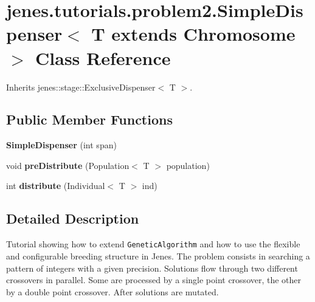 \hypertarget{classjenes_1_1tutorials_1_1problem2_1_1_simple_dispenser_3_01_t_01extends_01_chromosome_01_4}{
\section{jenes.tutorials.problem2.SimpleDispenser$<$ T extends Chromosome $>$ Class Reference}
\label{classjenes_1_1tutorials_1_1problem2_1_1_simple_dispenser_3_01_t_01extends_01_chromosome_01_4}
}
Inherits jenes::stage::ExclusiveDispenser$<$ T $>$.

\subsection*{Public Member Functions}
\begin{CompactItemize}
\item 
\hypertarget{classjenes_1_1tutorials_1_1problem2_1_1_simple_dispenser_3_01_t_01extends_01_chromosome_01_4_0c8ee6561c4336810cacc9fb7dad7993}{
\textbf{SimpleDispenser} (int span)}
\label{classjenes_1_1tutorials_1_1problem2_1_1_simple_dispenser_3_01_t_01extends_01_chromosome_01_4_0c8ee6561c4336810cacc9fb7dad7993}

\item 
\hypertarget{classjenes_1_1tutorials_1_1problem2_1_1_simple_dispenser_3_01_t_01extends_01_chromosome_01_4_deddb967a293817fab3f83bd9a04736d}{
void \textbf{preDistribute} (Population$<$ T $>$ population)}
\label{classjenes_1_1tutorials_1_1problem2_1_1_simple_dispenser_3_01_t_01extends_01_chromosome_01_4_deddb967a293817fab3f83bd9a04736d}

\item 
\hypertarget{classjenes_1_1tutorials_1_1problem2_1_1_simple_dispenser_3_01_t_01extends_01_chromosome_01_4_36cc589e5e73dd601e4bbf62835329ca}{
int \textbf{distribute} (Individual$<$ T $>$ ind)}
\label{classjenes_1_1tutorials_1_1problem2_1_1_simple_dispenser_3_01_t_01extends_01_chromosome_01_4_36cc589e5e73dd601e4bbf62835329ca}

\end{CompactItemize}


\subsection{Detailed Description}
Tutorial showing how to extend {\tt GeneticAlgorithm} and how to use the flexible and configurable breeding structure in Jenes. The problem consists in searching a pattern of integers with a given precision. Solutions flow through two different crossovers in parallel. Some are processed by a single point crossover, the other by a double point crossover. After solutions are mutated.

